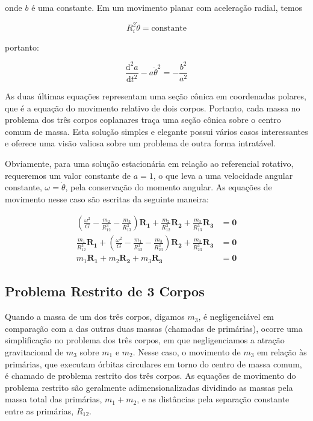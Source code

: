 onde $b$ é uma constante. Em um movimento planar com aceleração radial, temos

\begin{equation}
R_i^2\dot\theta = \text{constante}
\label{eq:7.16T}
\end{equation}

portanto:

\begin{equation}
\frac{\text{d}^2a}{\text{d}t^2}-a\dot{\theta}^2=-\frac{b^2}{a^2}
\label{eq:7.18T}
\end{equation}

As duas últimas equações representam uma seção cônica em coordenadas polares, que é a equação do movimento relativo de dois corpos. Portanto, cada massa no problema dos três corpos coplanares traça uma seção cônica sobre o centro comum de massa. Esta solução simples e elegante possui vários casos interessantes e oferece uma visão valiosa sobre um problema de outra forma intratável.

Obviamente, para uma solução estacionária em relação ao referencial rotativo, requeremos um valor constante de $a = 1$, o que leva a uma velocidade angular constante, $\omega=\dot\theta$, pela conservação do momento angular. As equações de movimento nesse caso são escritas da seguinte maneira:

\begin{equation}
\begin{aligned}
\left(\frac{\omega^2}{G}-\frac{m_2}{R_{12}^3}-\frac{m_3}{R_{13}^3}\right) \mathbf{R}_{\mathbf{1}}+\frac{m_2}{R_{12}^3} \mathbf{R}_{\mathbf{2}}+\frac{m_3}{R_{13}^3} \mathbf{R}_{\mathbf{3}} & =\mathbf{0} \\
\frac{m_1}{R_{12}^3} \mathbf{R}_{\mathbf{1}}+\left(\frac{\omega^2}{G}-\frac{m_1}{R_{12}^3}-\frac{m_3}{R_{23}^3}\right) \mathbf{R}_{\mathbf{2}}+\frac{m_3}{R_{23}^3} \mathbf{R}_{\mathbf{3}} & =\mathbf{0} \\
m_1 \mathbf{R}_{\mathbf{1}}+m_2 \mathbf{R}_{\mathbf{2}}+m_3 \mathbf{R}_{\mathbf{3}} & =\mathbf{0}
\label{eq:7.19T}
\end{aligned}
\end{equation}

\subsection{Problema Restrito de 3 Corpos}
Quando a massa de um dos três corpos, digamos $m_3$, é negligenciável em comparação com a das outras duas massas (chamadas de primárias), ocorre uma simplificação no problema dos três corpos, em que negligenciamos a atração gravitacional de $m_3$ sobre $m_1$ e $m_2$. Nesse caso, o movimento de $m_3$ em relação às primárias, que executam órbitas circulares em torno do centro de massa comum, é chamado de problema restrito dos três corpos. As equações de movimento do problema restrito são geralmente adimensionalizadas dividindo as massas pela massa total das primárias, $m_1 + m_2$, e as distâncias pela separação constante entre as primárias, $R_{12}$.

